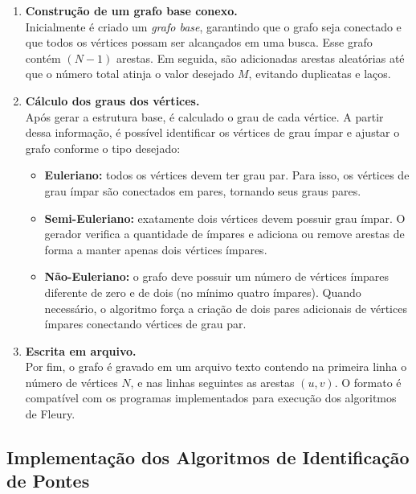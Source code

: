 \documentclass[12pt]{article}
\begin{document}
\begin{enumerate}
    \item \textbf{Construção de um grafo base conexo.}\\
    Inicialmente é criado um \textit{grafo base}, garantindo que o grafo seja conectado
    e que todos os vértices possam ser alcançados em uma busca.
    Esse grafo contém $(N-1)$ arestas.
    Em seguida, são adicionadas arestas aleatórias até que o número total atinja o valor desejado $M$,
    evitando duplicatas e laços.
    
    \item \textbf{Cálculo dos graus dos vértices.}\\
    Após gerar a estrutura base, é calculado o grau de cada vértice. 
    A partir dessa informação, é possível identificar os vértices de grau ímpar
    e ajustar o grafo conforme o tipo desejado:
    \begin{itemize}
        \item \textbf{Euleriano:} todos os vértices devem ter grau par.
        Para isso, os vértices de grau ímpar são conectados em pares,
        tornando seus graus pares.
        \item \textbf{Semi-Euleriano:} exatamente dois vértices devem possuir grau ímpar.
        O gerador verifica a quantidade de ímpares e adiciona ou remove arestas
        de forma a manter apenas dois vértices ímpares.
        \item \textbf{Não-Euleriano:} o grafo deve possuir um número de vértices ímpares
        diferente de zero e de dois (no mínimo quatro ímpares).
        Quando necessário, o algoritmo força a criação de dois pares adicionais
        de vértices ímpares conectando vértices de grau par.
    \end{itemize}

    \item \textbf{Escrita em arquivo.}\\
    Por fim, o grafo é gravado em um arquivo texto contendo na primeira linha
    o número de vértices $N$, e nas linhas seguintes as arestas $(u, v)$.
    O formato é compatível com os programas implementados
    para execução dos algoritmos de Fleury.
\end{enumerate}

\subsection{Implementação dos Algoritmos de Identificação de Pontes}
\end{document}
